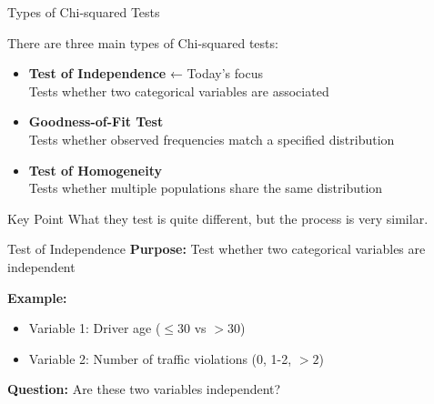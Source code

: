 \documentclass{beamer}					%
\begin{document}
\begin{frame}{Types of Chi-squared Tests}

\small
There are three main types of Chi-squared tests:
    
\vspace{0.8em}
\begin{itemize}
    \item \textbf{Test of Independence} ← Today's focus \\
    \hspace{1em} Tests whether {two categorical variables are associated}
    
    \vspace{0.6em}
    \item \textbf{Goodness-of-Fit Test} \\
    \hspace{1em} Tests whether {observed frequencies match a specified distribution}
    
    \vspace{0.6em}
    \item \textbf{Test of Homogeneity} \\
    \hspace{1em} Tests whether {multiple populations share the same distribution}
\end{itemize}
    
\vspace{0.8em}
\begin{alertblock}{Key Point}
What they test is quite different, but the process is very similar.
\end{alertblock}

\end{frame}

\begin{frame}{Test of Independence}
    \textbf{Purpose:} Test whether two categorical variables are independent
    
    \vspace{1em}
    \textbf{Example:}
    \begin{itemize}
        \item Variable 1: Driver age ($\le 30$ vs $> 30$)
        \item Variable 2: Number of traffic violations (0, 1-2, $>2$)
    \end{itemize}
    
    \vspace{1em}
    \textbf{Question:} Are these two variables independent?
\end{frame}
\end{document}
